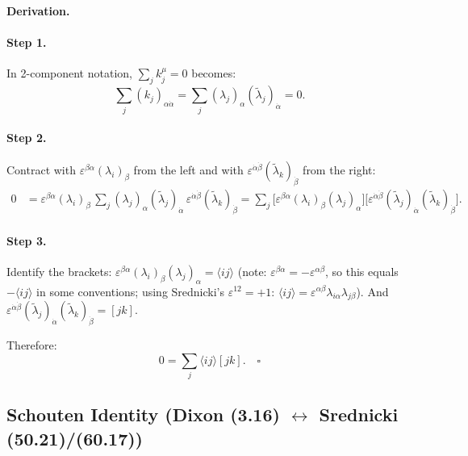 \textbf{Derivation.}

\paragraph{Step 1.} In 2-component notation, $\sum_j k_j^\mu=0$ becomes:
\begin{equation}
  \sum_j (k_j)_{\alpha\dot\alpha} = \sum_j (\lambda_j)_\alpha(\tilde\lambda_j)_{\dot\alpha} = 0.
\end{equation}

\paragraph{Step 2.} Contract with $\varepsilon^{\beta\alpha}(\lambda_i)_\beta$ from the left
and with $\varepsilon^{\dot\alpha\dot\beta}(\tilde\lambda_k)_{\dot\beta}$ from the right:
\begin{align}
  0 &= \varepsilon^{\beta\alpha}(\lambda_i)_\beta\,\sum_j(\lambda_j)_\alpha(\tilde\lambda_j)_{\dot\alpha}\,
       \varepsilon^{\dot\alpha\dot\beta}(\tilde\lambda_k)_{\dot\beta}
   = \sum_j\bigl[\varepsilon^{\beta\alpha}(\lambda_i)_\beta(\lambda_j)_\alpha\bigr]
            \bigl[\varepsilon^{\dot\alpha\dot\beta}(\tilde\lambda_j)_{\dot\alpha}(\tilde\lambda_k)_{\dot\beta}\bigr].
\end{align}

\paragraph{Step 3.} Identify the brackets:
$\varepsilon^{\beta\alpha}(\lambda_i)_\beta(\lambda_j)_\alpha = \langle ij\rangle$
(note: $\varepsilon^{\beta\alpha}=-\varepsilon^{\alpha\beta}$, so this equals $-\langle ij\rangle$
in some conventions; using Srednicki's $\varepsilon^{12}=+1$: $\langle ij\rangle=\varepsilon^{\alpha\beta}\lambda_{i\alpha}\lambda_{j\beta}$).
And $\varepsilon^{\dot\alpha\dot\beta}(\tilde\lambda_j)_{\dot\alpha}(\tilde\lambda_k)_{\dot\beta}=[jk]$.

Therefore:
\begin{equation}
  0 = \sum_j \langle ij\rangle[jk]. \quad\square
\end{equation}

\subsection{Schouten Identity (Dixon (3.16) $\leftrightarrow$ Srednicki (50.21)/(60.17))}
\label{sec:schouten}

